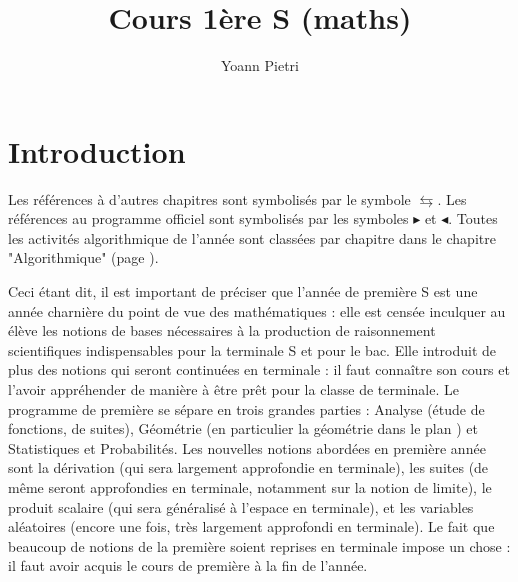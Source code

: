

\usepackage{float}
\usepackage{tkz-tab}

\usepackage[c]{esvect}
\usepackage{empheq}
\usepackage{moreverb}



\usepackage{xcolor}
\usepackage{hyperref}

\newcommand{\covec}[2]{\begin{pmatrix}#1 \\#2 \end{pmatrix}}
 
\makeatletter
\makeatother

\makeatletter
\renewcommand\theequation{\arabic{equation}}
\makeatother



\title{Cours 1ère S (maths)}
\author{Yoann Pietri}
\maketitle
\tableofcontents
\chapter*{Introduction}
Les références à d'autres chapitres sont symbolisés par le symbole $\leftrightarrows$. Les références au programme officiel sont symbolisés par les symboles $\blacktriangleright$ et $\blacktriangleleft$. Toutes les activités algorithmique de l'année sont classées par chapitre dans le chapitre "Algorithmique" (page \pageref{chap:algorithmique}). \newline

Ceci étant dit, il est important de préciser que l'année de première S est une année charnière du point de vue des mathématiques : elle est censée inculquer au élève les notions de bases nécessaires à la production de raisonnement scientifiques indispensables pour la terminale S et pour le bac. Elle introduit de plus des notions qui seront continuées en terminale : il faut connaître son cours et l'avoir appréhender de manière à être prêt pour la classe de terminale. Le programme de première se sépare en trois grandes parties : Analyse (étude de fonctions, de suites), Géométrie (en particulier la géométrie dans le plan ) et Statistiques et Probabilités. Les nouvelles notions abordées en première année sont la dérivation (qui sera largement approfondie en terminale), les suites (de même seront approfondies en terminale, notamment sur la notion de limite), le produit scalaire (qui sera généralisé à l'espace en terminale), et les variables aléatoires (encore une fois, très largement approfondi en terminale). Le fait que beaucoup de notions de la première soient reprises en terminale impose un chose : il faut avoir acquis le cours de première à la fin de l'année.\newline

